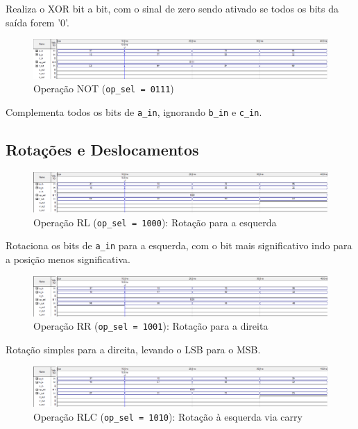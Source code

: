 Realiza o XOR bit a bit, com o sinal de zero sendo ativado se todos os bits da saída forem '0'.

\begin{figure}[H]
\centering
\includegraphics[width=\textwidth]{images/alu_0111.png}
\caption{Operação NOT (\texttt{op\_sel = 0111})}
\end{figure}

Complementa todos os bits de \texttt{a\_in}, ignorando \texttt{b\_in} e \texttt{c\_in}.

\subsection{Rotações e Deslocamentos}

\begin{figure}[H]
\centering
\includegraphics[width=\textwidth]{images/alu_1000.png}
\caption{Operação RL (\texttt{op\_sel = 1000}): Rotação para a esquerda}
\end{figure}

Rotaciona os bits de \texttt{a\_in} para a esquerda, com o bit mais significativo indo para a posição menos significativa.

\begin{figure}[H]
\centering
\includegraphics[width=\textwidth]{images/alu_1001.png}
\caption{Operação RR (\texttt{op\_sel = 1001}): Rotação para a direita}
\end{figure}

Rotação simples para a direita, levando o LSB para o MSB.

\begin{figure}[H]
\centering
\includegraphics[width=\textwidth]{images/alu_1010.png}
\caption{Operação RLC (\texttt{op\_sel = 1010}): Rotação à esquerda via carry}
\end{figure}

